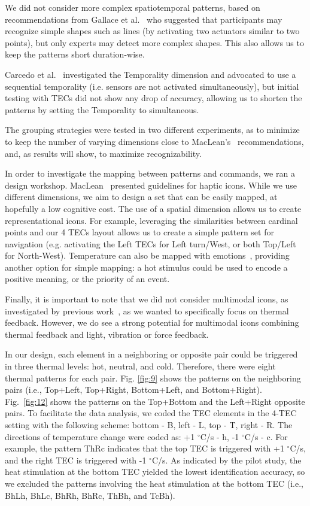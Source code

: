 \documentclass[preprint,12pt]{elsarticle}
\begin{document}
We did not consider more complex spatiotemporal patterns, based on recommendations from Gallace et al.~\cite{Gallace2007} who suggested that participants may recognize simple shapes such as lines (by activating two actuators similar to two points), but only experts may detect more complex shapes. This also allows us to keep the patterns short duration-wise.

Carcedo et al.~\cite{1} investigated the Temporality dimension and advocated to use a sequential temporality (i.e. sensors are not activated simultaneously), but initial testing with TECs did not show any drop of accuracy, allowing us to shorten the patterns by setting the Temporality to simultaneous.

The grouping strategies were tested in two different experiments, as to minimize to keep the number of varying dimensions close to MacLean's~\cite{MacLean2008} recommendations, and, as results will show, to maximize recognizability.

In order to investigate the mapping between patterns and commands, we ran a design workshop. MacLean~\cite{MacLean2008} presented guidelines for haptic icons. While we use different dimensions, we aim to design a set that can be easily mapped, at hopefully a low cognitive cost.
The use of a spatial dimension allows us to create representational icons. For example, leveraging the similarities between cardinal points and our 4 TECs layout allows us to create a simple pattern set for navigation (e.g. activating the Left TECs for Left turn/West, or both Top/Left for North-West). Temperature can also be mapped with emotions~\cite{35,37}, providing another option for simple mapping: a hot stimulus could be used to encode a positive meaning, or the priority of an event.

Finally, it is important to note that we did not consider multimodal icons, as investigated by previous work~\cite{Chan2008}, as we wanted to specifically focus on thermal feedback. However, we do see a strong potential for multimodal icons combining thermal feedback and light, vibration or force feedback.

In our design, each element in a neighboring or opposite pair could be triggered in three thermal levels: hot, neutral, and cold. Therefore, there were eight thermal patterns for each pair. Fig. \ref{fig:9} shows the  patterns on the neighboring pairs (i.e., Top+Left, Top+Right, Bottom+Left, and Bottom+Right). Fig.~\ref{fig:12} shows the patterns on the Top+Bottom and the Left+Right opposite pairs. To facilitate the data analysis, we coded the TEC elements in the 4-TEC setting with the following scheme: bottom - B, left - L, top - T, right - R. The directions of temperature change were coded as: +1 $^{\circ}$C/s - h, -1 $^{\circ}$C/s - c. For example, the pattern ThRc indicates that the top TEC is triggered with +1 $^{\circ}$C/s, and the right TEC is triggered with -1 $^{\circ}$C/s. As indicated by the pilot study, the heat stimulation at the bottom TEC yielded the lowest identification accuracy, so we excluded the patterns involving the heat stimulation at the bottom TEC (i.e., BhLh, BhLc, BhRh, BhRc, ThBh, and TcBh).
\end{document}
